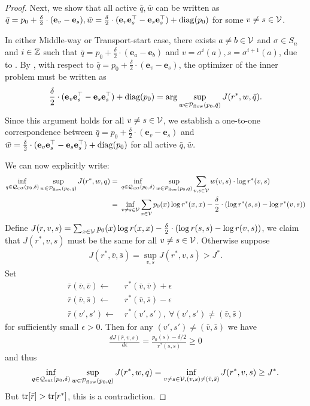 \begin{proof}
Next, we show that all active $\bar q, \bar w$ can be written as $\bar q = p_0 + \frac{\delta}{2}\cdot (\mathbf{e}_v - \mathbf{e}_s), \bar w = \frac{\delta}{2} \cdot (\mathbf{e}_{v}\mathbf{e}_{s}^\top - \mathbf{e}_{s}\mathbf{e}_{s}^\top) + \mathrm{diag}(p_0)$ for some $v\neq s \in \mathcal{V}$.

In either Middle-way or Transport-start case, there exists $a \neq b \in \mathcal{V}$ and $\sigma \in S_n$ and $i \in \mathbb{Z}$ such that $\bar q = p_0 + \frac{\delta}{2}\cdot (\mathbf{e}_a - \mathbf{e}_b)$ and $v = \sigma^i(a), s = \sigma^{i+1}(a)$, due to . By , with respect to $\bar q = p_0 + \frac{\delta}{2}\cdot(\mathbf{e}_v-\mathbf{e}_s)$, the optimizer of the inner problem 
must be written as 
\begin{align*}
    \frac{\delta}{2}\cdot(\mathbf{e}_v\mathbf{e}_s^\top - \mathbf{e}_s \mathbf{e}_s^\top) + \text{diag}(p_0) = \arg\sup_{w \in \mathcal{P}_{\mathrm{flow}}(p_0,\bar q)} J(r^*, w,\bar q).
\end{align*}
Since this argument holds for all $v \neq s \in \mathcal{V}$, we establish a one-to-one correspondence between $\bar q = p_0 + \frac{\delta}{2}\cdot (\mathbf{e}_v - \mathbf{e}_s)$ and $\bar w = \frac{\delta}{2} \cdot (\mathbf{e}_{v}\mathbf{e}_{s}^\top - \mathbf{e}_{s}\mathbf{e}_{s}^\top) + \mathrm{diag}(p_0)$ for all active $\bar q, \bar w$.

We can now explicitly write:
\begin{align*}
    \inf_{q \in \mathcal{Q}_{\text{ext}}(p_0,\delta)} \sup_{w \in \mathcal{P}_{\mathrm{flow}}(p_0,q)} J(r^*,w,q) = &~ \inf_{q \in \mathcal{Q}_{\text{ext}}(p_0,\delta)} \sup_{w \in \mathcal{P}_{\mathrm{flow}}(p_0,q)} \sum_{v,s \in \mathcal{V}} w(v,s) \cdot \log r^*(v,s)\\
    = &~ \inf_{v \neq s \in \mathcal{V}}\sum_{x \in \mathcal{V}} p_0(x) \log r^*(x,x) - \frac{\delta}{2}\cdot(\log r^*(s,s) - \log r^*(v,s))
\end{align*}
Define $J(r, v,s) = \sum_{x \in \mathcal{V}} p_0(x) \log r(x,x) - \frac{\delta}{2}\cdot(\log r(s,s) - \log r(v,s))$, we claim that $J(r^*, v,s)$ must be the same for all $v \neq s \in \mathcal{V}$.
Otherwise suppose
\begin{align*}
    J(r^*, \bar v, \bar s) = \sup_{v,s}J(r^*, v,s) > J^*.
\end{align*}
Set
\begin{align*}
    \bar r(\bar v, \bar v) \leftarrow &~  r^*(\bar v, \bar v) + \epsilon\\
    \bar r(\bar v, \bar s) \leftarrow &~  r^*(\bar v, \bar s) - \epsilon\\
    \bar r(v',s') \leftarrow &~  r^*(v',s'), ~\forall (v',s') \neq (\bar v, \bar s)
\end{align*}
for sufficiently small $\epsilon > 0$. Then for any $(v',s') \neq (\bar v, \bar s)$ we have 
\begin{align*}
    \frac{d J(\bar r, v,s)}{d\epsilon} = \frac{p_0(s) - \delta/2}{r^*(s,s)} \geq 0
\end{align*}
and thus
\begin{align*}
    \inf_{q \in \mathcal{Q}_{\mathrm{ext}}(p_0,\delta)} \sup_{w \in \mathcal{P}_{\mathrm{flow}}(p_0,q)} J(r^*,w,q) = \inf_{v \neq s \in \mathcal{V}, (v,s) \neq (\bar v, \bar s)}J(r^*, v,s) \geq J^*.
\end{align*}
But $\mathrm{tr}[\bar r] > \mathrm{tr} [r^*]$, this is a contradiction.


\end{proof}
